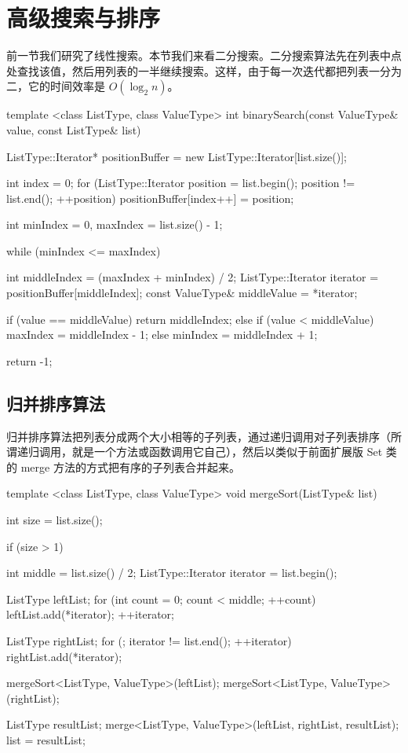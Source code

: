 \section{高级搜索与排序}

前一节我们研究了线性搜索。本节我们来看二分搜索。二分搜索算法先在列表中点处查找该值，然后用列表的一半继续搜索。这样，由于每一次迭代都把列表一分为二，它的时间效率是 $O(\log_2 n)$。

\medskip{}

\begin{codebox}
template <class ListType, class ValueType>
int binarySearch(const ValueType& value, const ListType& list) {
  ListType::Iterator* positionBuffer =
    new ListType::Iterator[list.size()];

  int index = 0;
  for (ListType::Iterator position = list.begin();
       position != list.end(); ++position) {
    positionBuffer[index++] = position;
  }

  int minIndex = 0, maxIndex = list.size() - 1;

  while (minIndex <= maxIndex) {
    int middleIndex = (maxIndex + minIndex) / 2;
    ListType::Iterator iterator = positionBuffer[middleIndex];
    const ValueType& middleValue = *iterator;

    if (value == middleValue) {
      return middleIndex;
    }
    else if (value < middleValue) {
      maxIndex = middleIndex - 1;
    }
    else {
      minIndex = middleIndex + 1;
    }
  }

  return -1;
}
\end{codebox}

\subsection{归并排序算法}

归并排序算法把列表分成两个大小相等的子列表，通过递归调用对子列表排序（所谓递归调用，就是一个方法或函数调用它自己），然后以类似于前面扩展版 Set 类的 merge 方法的方式把有序的子列表合并起来。

\medskip{}

\begin{codebox}
template <class ListType, class ValueType>
void mergeSort(ListType& list) {
  int size = list.size();

  if (size > 1) {
    int middle = list.size() / 2;
    ListType::Iterator iterator = list.begin();

    ListType leftList;
    for (int count = 0; count < middle; ++count) {
      leftList.add(*iterator);
      ++iterator;
    }

    ListType rightList;
    for (; iterator != list.end(); ++iterator) {
      rightList.add(*iterator);
    }

    mergeSort<ListType, ValueType>(leftList);
    mergeSort<ListType, ValueType>(rightList);

    ListType resultList;
    merge<ListType, ValueType>(leftList, rightList, resultList);
    list = resultList;
  }
}
\end{codebox}

